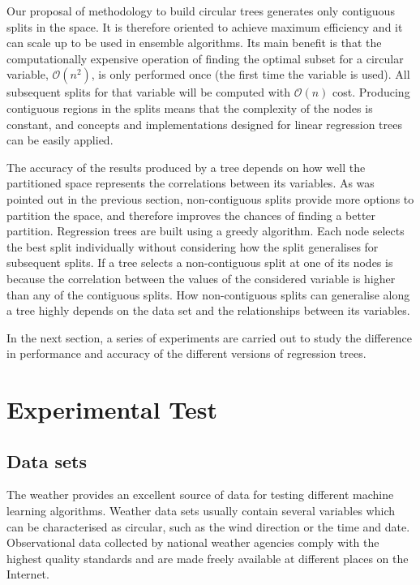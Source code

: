 \documentclass[times,twocolumn,final,authoryear]{elsarticle}
\begin{document}
Our proposal of methodology to build circular trees generates only contiguous splits in the space. It is therefore oriented to achieve maximum efficiency and it can scale up to be used in ensemble algorithms. Its main benefit is that the computationally expensive operation of finding the optimal subset for a circular variable, $\mathcal{O}(n^2)$, is only performed once (the first time the variable is used). All subsequent splits for that variable will be computed with $\mathcal{O}(n)$ cost. Producing contiguous regions in the splits means that the complexity of the nodes is constant, and concepts and implementations designed for linear regression trees can be easily applied.

The accuracy of the results produced by a tree depends on how well the partitioned space represents the correlations between its variables. As was pointed out in the previous section, non-contiguous splits provide more options to partition the space, and therefore improves the chances of finding a better partition. Regression trees are built using a greedy algorithm. Each node selects the best split individually without considering how the split generalises for subsequent splits. If a tree selects a non-contiguous split at one of its nodes is because the correlation between the values of the considered variable is higher than any of the contiguous splits. How non-contiguous splits can generalise along a tree highly depends on the data set and the relationships between its variables.

In the next section, a series of experiments are carried out to study the difference in performance and accuracy of the different versions of regression trees.


\section{Experimental Test}

\subsection{Data sets}

The weather provides an excellent source of data for testing different machine learning algorithms. Weather data sets usually contain several variables which can be characterised as circular, such as the wind direction or the time and date. Observational data collected by national weather agencies comply with the highest quality standards and are made freely available at different places on the Internet.
\end{document}
